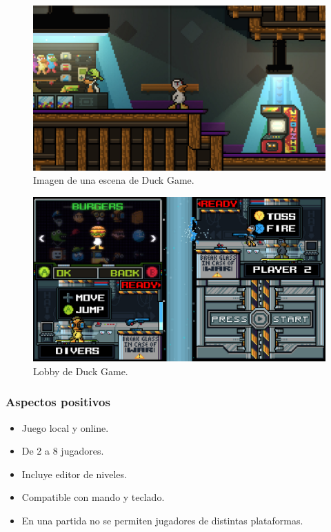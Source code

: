 \documentclass[12pt, spanish]{article}
\begin{document}
\begin{figure}[H]
  \centering
   \includegraphics[width=\textwidth]{"competencia/dg_muestra.jpg"}
	\caption{Imagen de una escena de Duck Game.}
\end{figure}


\begin{figure}[H]
  \centering
   \includegraphics[width=\textwidth]{"competencia/dg_lobby.jpg"}
	\caption{Lobby de Duck Game.}
\end{figure}

\subsubsection{Aspectos positivos}

\begin{itemize}
	\item Juego local y online.
	\item De 2 a 8 jugadores.
	\item Incluye editor de niveles.
	\item Compatible con mando y teclado.
	\item En una partida no se permiten jugadores de distintas plataformas.
\end{itemize}
\end{document}

